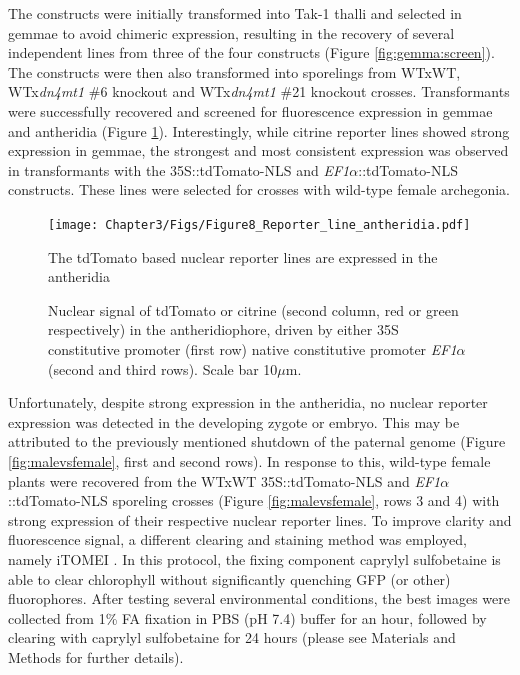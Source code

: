 The constructs were initially transformed into Tak-1 thalli and selected in gemmae to avoid chimeric expression, resulting in the recovery of several independent lines from three of the four constructs (Figure \ref{fig:gemma:screen}). The constructs were then also transformed into sporelings from WTxWT, WTx\textit{dn4mt1} \#6 knockout and WTx\textit{dn4mt1} \#21 knockout crosses. Transformants were successfully recovered and screened for fluorescence expression in gemmae and antheridia (Figure \ref{fig:antheridia_screen}). Interestingly, while citrine reporter lines showed strong expression in gemmae, the strongest and most consistent expression was observed in transformants with the 35S::tdTomato-NLS and \textit{EF1$\alpha$}::tdTomato-NLS constructs. These lines were selected for crosses with wild-type female archegonia.

\begin{figure}[htbp!] 
\centering    
    \texttt{[image: Chapter3/Figs/Figure8\_Reporter\_line\_antheridia.pdf]}
\caption{The tdTomato based nuclear reporter lines are expressed in the antheridia}
\label{fig:antheridia_screen}
\captionsetup{font=small}
    \caption*{Nuclear signal of tdTomato or citrine (second column, red or green respectively) in the antheridiophore, driven by either 35S constitutive promoter (first row) native constitutive promoter \textit{EF1$\alpha$} (second and third rows). Scale bar 10$\mu$m.}
\end{figure}

Unfortunately, despite strong expression in the antheridia, no nuclear reporter expression was detected in the developing zygote or embryo. This may be attributed to the previously mentioned shutdown of the paternal genome (Figure \ref{fig:malevsfemale}, first and second rows).  In response to this, wild-type female plants were recovered from the WTxWT 35S::tdTomato-NLS and  \textit{EF1$\alpha$}::tdTomato-NLS sporeling crosses (Figure \ref{fig:malevsfemale}, rows 3 and 4) with strong expression of their respective nuclear reporter lines. To improve clarity and fluorescence signal, a different clearing and staining method was employed, namely iTOMEI \cite{RN279}. In this protocol, the fixing component caprylyl sulfobetaine is able to clear chlorophyll without significantly quenching GFP (or other) fluorophores. After testing several environmental conditions, the best images were collected from 1\% FA fixation in PBS (pH 7.4) buffer for an hour, followed by clearing with caprylyl sulfobetaine for 24 hours (please see Materials and Methods for further details).

